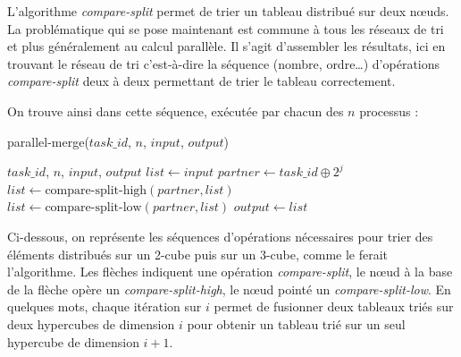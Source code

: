 L'algorithme \textit{compare-split} permet de trier un tableau distribué sur deux nœuds. La problématique qui se pose maintenant est commune à tous les réseaux de tri et plus généralement au calcul parallèle. Il s'agit d'assembler les résultats, ici en trouvant le réseau de tri c'est-à-dire la séquence (nombre, ordre…) d'opérations \textit{compare-split} deux à deux permettant de trier le tableau correctement.

On trouve ainsi dans \cite{GRAMA} cette séquence, exécutée par chacun des $n$ processus :

\begin{algorithm}
\caption{parallel-merge($task\_id$, $n$, $input$, $output$)}
\begin{algorithmic}
\REQUIRE $task\_id$, $n$, $input$, $output$
\STATE $list \leftarrow input$
\STATE $partner \leftarrow task\_id \oplus 2^j$
\STATE $list \leftarrow \text{compare-split-high} (partner, list)$
\ELSE
\STATE $list \leftarrow \text{compare-split-low} (partner, list)$
\ENDIF
\ENDFOR
\ENDFOR
\STATE $output \leftarrow list$
\end{algorithmic}
\end{algorithm}

Ci-dessous, on représente les séquences d'opérations nécessaires pour trier des éléments distribués sur un 2-cube puis sur un 3-cube, comme le ferait l'algorithme. Les flèches indiquent une opération \textit{compare-split}, le nœud à la base de la flèche opère un \textit{compare-split-high}, le nœud pointé un \textit{compare-split-low}. En quelques mots, chaque itération sur $i$ permet de fusionner deux tableaux triés sur deux hypercubes de dimension $i$ pour obtenir un tableau trié sur un seul hypercube de dimension $i+1$.

